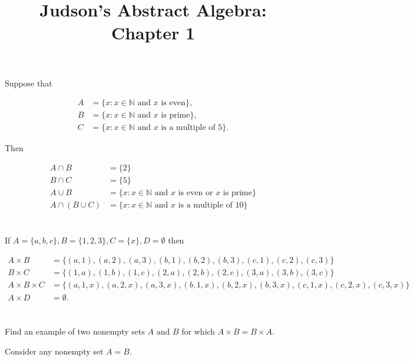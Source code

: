 \documentclass[a4paper]{article}
\title{Judson's Abstract Algebra: Chapter 1}
\date{}
\begin{document}
\maketitle

\section{}

Suppose that 

\begin{align*}
A &= \{ x : x \in \mathbb{N} \text{ and } x \text{ is even}\}, \\
B &= \{ x : x \in \mathbb{N} \text{ and } x \text{ is prime}\}, \\
C &= \{ x : x \in \mathbb{N} \text{ and } x \text{ is a multiple of 5}\}.
\end{align*}

Then

\begin{align*}
A \cap B &= \{ 2 \} \\
B \cap C &= \{ 5 \} \\
A \cup B &= \{ x : x \in \mathbb{N} \text{ and } x \text{ is even or } x \text{ is prime}\} \\
A \cap (B \cup C) &= \{ x : x \in \mathbb{N} \text{ and } x \text{ is a multiple of 10}\}
\end{align*}


\section{}

If $A = \{ a, b, c \}, B = \{ 1, 2, 3 \}, C = \{ x \}, D = \emptyset$ then

\begin{align*}
A \times B &= \{ (a,1), (a,2), (a,3), (b,1), (b,2), (b,3), (c,1), (c,2), (c,3)\} \\
B \times C &= \{ (1,a), (1,b), (1,c), (2,a), (2,b), (2,c), (3,a), (3,b), (3,c)\} \\
A \times B \times C &= \{ (a,1,x), (a,2,x), (a,3,x), (b,1,x), (b,2,x), (b,3,x), (c,1,x), (c,2,x), (c,3,x)\} \\
A \times D &= \emptyset.
\end{align*}

\section{}

Find an example of two nonempty sets $A$ and $B$ for which $A \times B = B \times A$.

Consider any nonempty set $A = B$.
\end{document}
